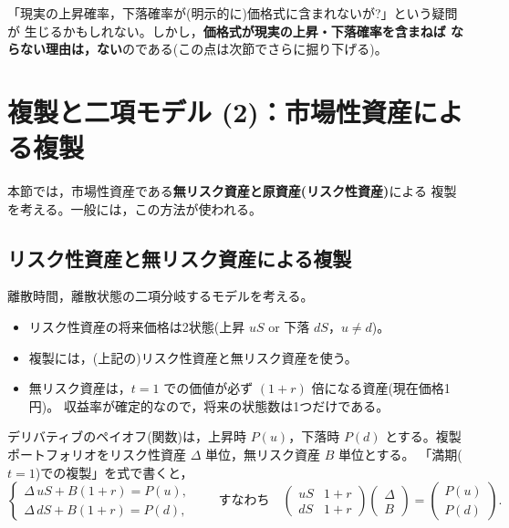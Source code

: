 \begin{remark}
「現実の上昇確率，下落確率が(明示的に)価格式に含まれないが?」という疑問が
生じるかもしれない。しかし，\textbf{価格式が現実の上昇・下落確率を含まねば
ならない理由は，ない}のである(この点は次節でさらに掘り下げる)。
\end{remark}

\vspace{18pt}

\section{複製と二項モデル (2)：市場性資産による複製}

本節では，市場性資産である\textbf{無リスク資産と原資産(リスク性資産)}による
複製を考える。一般には，この方法が使われる。

\subsection{リスク性資産と無リスク資産による複製}

離散時間，離散状態の二項分岐するモデルを考える。
\begin{itemize}
\item リスク性資産の将来価格は2状態(上昇 $uS$ or 下落 $dS$，$u\neq d$)。
\item 複製には，(上記の)リスク性資産と無リスク資産を使う。
\item 無リスク資産は，$t=1$ での価値が必ず $(1+r)$ 倍になる資産(現在価格1円)。
収益率が確定的なので，将来の状態数は1つだけである。
\end{itemize}

デリバティブのペイオフ(関数)は，上昇時 $P(u)$，下落時 $P(d)$ とする。複製
ポートフォリオをリスク性資産 $\Delta$ 単位，無リスク資産 $B$ 単位とする。
「満期($t=1$)での複製」を式で書くと，
\begin{equation}
\begin{cases}
\Delta\,uS + B(1+r) = P(u),\\
\Delta\,dS + B(1+r) = P(d),
\end{cases}
\qquad\text{すなわち}\quad
\begin{pmatrix} uS & 1+r\\ dS & 1+r\end{pmatrix}
\begin{pmatrix}\Delta\\ B\end{pmatrix}
= \begin{pmatrix}P(u)\\ P(d)\end{pmatrix}.
\label{eq:replication-system}
\end{equation}

